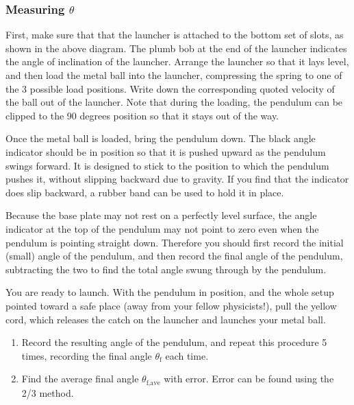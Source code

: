 \subsubsection{Measuring $\theta$}

First, make sure that that the launcher is attached to the bottom set of slots, as shown in the above diagram. The plumb bob at the end of the launcher indicates the angle of inclination of the launcher.  Arrange the launcher so that it lays level, and then load the metal ball into the launcher, compressing the spring to one of the 3 possible load positions. Write down the corresponding quoted velocity of the ball out of the launcher.  Note that during the loading, the pendulum can be clipped to the 90 degrees position so that it stays out of the way. \myskip

Once the metal ball is loaded, bring the pendulum down.  The black angle indicator should be in position so that it is pushed upward as the pendulum swings forward.  It is designed to stick to the position to which the pendulum pushes it, without slipping backward due to gravity.  If you find that the indicator does slip backward, a rubber band can be used to hold it in place. \myskip

Because the base plate may not rest on a perfectly level surface, the angle indicator at the top of the pendulum may not point to zero even when the pendulum is pointing straight down.  Therefore you should first record the initial (small) angle of the pendulum, and then record the final angle of the pendulum, subtracting the two to find the total angle swung through by the pendulum.\myskip

You are ready to launch.  With the pendulum in position, and the whole setup pointed toward a safe place (away from your fellow physicists!), pull the yellow cord, which releases the catch on the launcher and launches your metal ball.
\begin{enumerate}
\item Record the resulting angle of the pendulum, and repeat this procedure 5 times, recording the final angle $\theta_\text{f}$ each time.
\item Find the average final angle $\theta_\text{f,ave}$ with error. Error can be found using the 2/3 method.
\end{enumerate}

